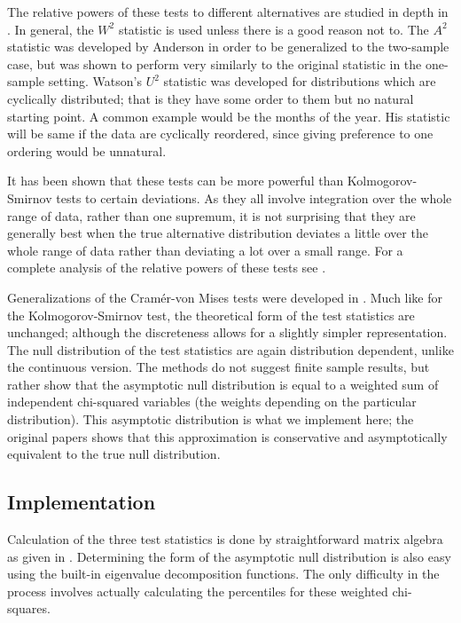The relative powers of these tests to different alternatives are studied in depth in \cite{stephens1974}. In general, the $W^2$
statistic is used unless there is a good reason not to. The $A^2$ statistic was developed by Anderson in order to be
generalized to the two-sample case, but was shown to perform very similarly to the original statistic in the one-sample
setting. Watson's $U^2$ statistic was developed for distributions which are cyclically distributed; that is they have some
order to them but no natural starting point. A common example would be the months of the year. His statistic will be same
if the data are cyclically reordered, since giving preference to one ordering would be unnatural. 

It has been shown that these tests can be more powerful than Kolmogorov-Smirnov tests to certain deviations. As they all involve
integration over the whole range of data, rather than one supremum, it is not surprising that they are generally best when the
true alternative distribution deviates a little over the whole range of data rather than deviating a lot over a small range. For
a complete analysis of the relative powers of these tests see \cite{stephens1974}.

Generalizations of the Cram\'{e}r-von Mises tests were developed in \cite{choulakian1994}. Much like for the Kolmogorov-Smirnov test,
the theoretical form of the test statistics are unchanged; although the discreteness allows for a slightly simpler representation.
The null distribution of the test statistics are again distribution dependent, unlike the continuous version. The methods do not
suggest finite sample results, but rather show that the asymptotic null distribution is equal to a weighted sum of independent
chi-squared variables (the weights depending on the particular distribution). This asymptotic distribution is what we implement here;
the original papers shows that this approximation is conservative and asymptotically equivalent to the true null distribution.

\subsection{Implementation}

Calculation of the three test statistics is done by straightforward matrix algebra as given in \cite{choulakian1994}. Determining 
the form of the asymptotic null distribution is also easy using the built-in eigenvalue decomposition functions. The only 
difficulty in the process involves actually calculating the percentiles for these weighted chi-squares. 


